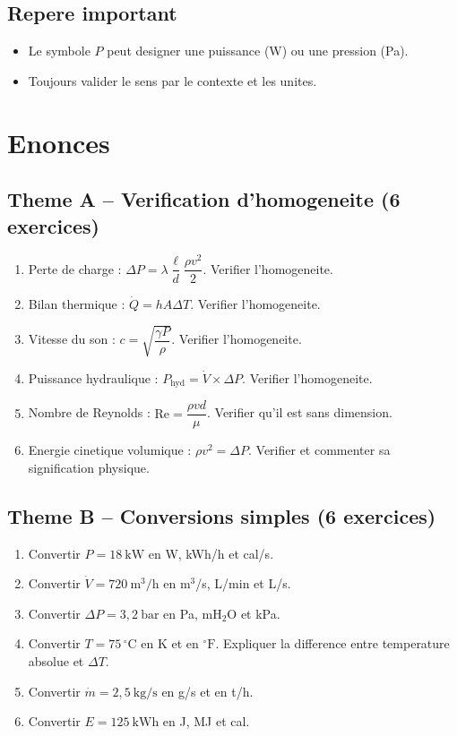 \subsection*{Repere important}
\begin{itemize}[leftmargin=1.4em, itemsep=0.3em]
  \item Le symbole $P$ peut designer une puissance (W) ou une pression (Pa).
  \item Toujours valider le sens par le contexte et les unites.
\end{itemize}

\section*{Enonces}

\subsection*{Theme A -- Verification d'homogeneite (6 exercices)}
\begin{enumerate}[label=\textbf{A\arabic*}, leftmargin=1.8cm, itemsep=0.4em]
  \item Perte de charge : $\Delta P = \lambda \dfrac{\ell}{d} \dfrac{\rho v^2}{2}$. Verifier l'homogeneite.
  \item Bilan thermique : $\dot{Q} = h A \Delta T$. Verifier l'homogeneite.
  \item Vitesse du son : $c = \sqrt{\dfrac{\gamma P}{\rho}}$. Verifier l'homogeneite.
  \item Puissance hydraulique : $P_{\mathrm{hyd}} = \dot{V} \times \Delta P$. Verifier l'homogeneite.
  \item Nombre de Reynolds : $\mathrm{Re} = \dfrac{\rho v d}{\mu}$. Verifier qu'il est sans dimension.
  \item Energie cinetique volumique : $\rho v^2 = \Delta P$. Verifier et commenter sa signification physique.
\end{enumerate}

\subsection*{Theme B -- Conversions simples (6 exercices)}
\begin{enumerate}[label=\textbf{B\arabic*}, leftmargin=1.8cm, itemsep=0.4em]
  \item Convertir $P = 18~\mathrm{kW}$ en W, kWh/h et cal/s.
  \item Convertir $\dot{V} = 720~\mathrm{m^3/h}$ en m$^3$/s, L/min et L/s.
  \item Convertir $\Delta P = 3{,}2~\mathrm{bar}$ en Pa, mH$_2$O et kPa.
  \item Convertir $T = 75\,^\circ\mathrm{C}$ en K et en $^\circ\mathrm{F}$. Expliquer la difference entre temperature absolue et $\Delta T$.
  \item Convertir $\dot{m} = 2{,}5~\mathrm{kg/s}$ en g/s et en t/h.
  \item Convertir $E = 125~\mathrm{kWh}$ en J, MJ et cal.
\end{enumerate}

